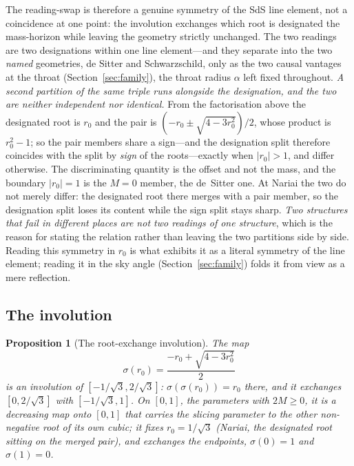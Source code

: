 \documentclass[11pt,a4paper]{article}
\newtheorem{proposition}[theorem]{Proposition}
\theoremstyle{definition}
\begin{document}
The reading-swap is therefore a genuine symmetry of the SdS line element, not a coincidence at one point: the involution exchanges which root is designated the mass-horizon while leaving the geometry strictly unchanged. The two readings are two designations within one line element---and they separate into the two \emph{named} geometries, de Sitter and Schwarzschild, only as the two causal vantages at the throat (Section~\ref{sec:family}), the throat radius $\alpha$ left fixed throughout. \emph{A second partition of the same triple runs alongside the designation, and the two are neither independent nor identical.} From the factorisation above the designated root is $r_{0}$ and the pair is $(-r_{0}\pm\sqrt{4-3r_{0}^{2}})/2$, whose product is $r_{0}^{2}-1$; so the pair members share a sign---and the designation split therefore coincides with the split by \emph{sign} of the roots---exactly when $|r_{0}|>1$, and differ otherwise. The discriminating quantity is the offset and not the mass, and the boundary $|r_{0}|=1$ is the $M=0$ member, the de~Sitter one. At Nariai the two do not merely differ: the designated root there merges with a pair member, so the designation split loses its content while the sign split stays sharp. \emph{Two structures that fail in different places are not two readings of one structure}, which is the reason for stating the relation rather than leaving the two partitions side by side. Reading this symmetry in $r_{0}$ is what exhibits it as a literal symmetry of the line element; reading it in the sky angle (Section~\ref{sec:family}) folds it from view as a mere reflection.

\subsection{The involution}

\begin{proposition}[The root-exchange involution]\label{prop:involution}
The map
\begin{equation}\label{eq:involution}
  \sigma(r_{0})=\frac{-r_{0}+\sqrt{4-3r_{0}^{2}}}{2}
\end{equation}
is an involution of $[-1/\sqrt{3},2/\sqrt{3}]$: $\sigma(\sigma(r_{0}))=r_{0}$ there, and it exchanges $[0,2/\sqrt{3}]$ with $[-1/\sqrt{3},1]$. On $[0,1]$, the parameters with $2M\ge0$, it is a decreasing map onto $[0,1]$ that carries the slicing parameter to the other non-negative root of its own cubic; it fixes $r_{0}=1/\sqrt{3}$ (Nariai, the designated root sitting on the merged pair), and exchanges the endpoints, $\sigma(0)=1$ and $\sigma(1)=0$.
\end{proposition}
\end{document}
